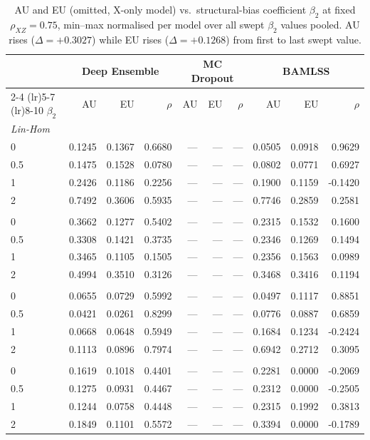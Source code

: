 \begin{table}
\centering
\small
\setlength{\tabcolsep}{4pt}
\caption{AU and EU (omitted, X-only model) vs.\ structural-bias coefficient $\beta_2$ at fixed $\rho_{XZ}=0.75$, min--max normalised per model over all swept $\beta_2$ values pooled. AU rises (\ensuremath{\Delta=+0.3027}) while EU rises (\ensuremath{\Delta=+0.1268}) from first to last swept value.}
\label{tab:ovb}
\begin{tabular}{lrrrrrrrrr}
\toprule
 & \multicolumn{3}{c}{Deep Ensemble} & \multicolumn{3}{c}{MC Dropout} & \multicolumn{3}{c}{BAMLSS} \\
\cmidrule(lr){2-4} \cmidrule(lr){5-7} \cmidrule(lr){8-10}
$\beta_2$ & AU & EU & $\rho$ & AU & EU & $\rho$ & AU & EU & $\rho$ \\
\midrule
\multicolumn{10}{l}{\textit{Lin-Hom}} \\
0 & 0.1245 & 0.1367 & 0.6680 & --- & --- & --- & 0.0505 & 0.0918 & 0.9629 \\
0.5 & 0.1475 & 0.1528 & 0.0780 & --- & --- & --- & 0.0802 & 0.0771 & 0.6927 \\
1 & 0.2426 & 0.1186 & 0.2256 & --- & --- & --- & 0.1900 & 0.1159 & -0.1420 \\
2 & 0.7492 & 0.3606 & 0.5935 & --- & --- & --- & 0.7746 & 0.2859 & 0.2581 \\
\addlinespace
\multicolumn{10}{l}{\textit{Lin-Het}} \\
0 & 0.3662 & 0.1277 & 0.5402 & --- & --- & --- & 0.2315 & 0.1532 & 0.1600 \\
0.5 & 0.3308 & 0.1421 & 0.3735 & --- & --- & --- & 0.2346 & 0.1269 & 0.1494 \\
1 & 0.3465 & 0.1105 & 0.1505 & --- & --- & --- & 0.2356 & 0.1563 & 0.0989 \\
2 & 0.4994 & 0.3510 & 0.3126 & --- & --- & --- & 0.3468 & 0.3416 & 0.1194 \\
\addlinespace
\multicolumn{10}{l}{\textit{Sin-Hom}} \\
0 & 0.0655 & 0.0729 & 0.5992 & --- & --- & --- & 0.0497 & 0.1117 & 0.8851 \\
0.5 & 0.0421 & 0.0261 & 0.8299 & --- & --- & --- & 0.0776 & 0.0887 & 0.6859 \\
1 & 0.0668 & 0.0648 & 0.5949 & --- & --- & --- & 0.1684 & 0.1234 & -0.2424 \\
2 & 0.1113 & 0.0896 & 0.7974 & --- & --- & --- & 0.6942 & 0.2712 & 0.3095 \\
\addlinespace
\multicolumn{10}{l}{\textit{Sin-Het}} \\
0 & 0.1619 & 0.1018 & 0.4401 & --- & --- & --- & 0.2281 & 0.0000 & -0.2069 \\
0.5 & 0.1275 & 0.0931 & 0.4467 & --- & --- & --- & 0.2312 & 0.0000 & -0.2505 \\
1 & 0.1244 & 0.0758 & 0.4448 & --- & --- & --- & 0.2315 & 0.1992 & 0.3813 \\
2 & 0.1849 & 0.1101 & 0.5572 & --- & --- & --- & 0.3394 & 0.0000 & -0.1789 \\
\bottomrule
\end{tabular}
\end{table}
